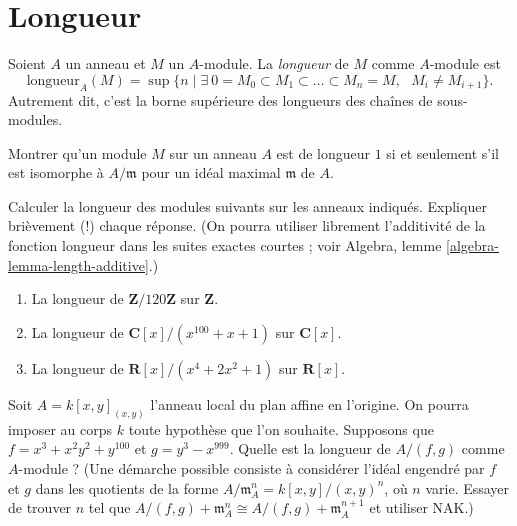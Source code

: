 \section{Longueur}
\label{section-length}

\begin{definition}
\label{definition-length}
Soient $A$ un anneau et $M$ un $A$-module. La
{\it longueur} de $M$ comme $A$-module est
$$
\text{longueur}_A(M)
=
\sup
\{
n
\mid
\exists\ 0 = M_0 \subset M_1 \subset \ldots \subset M_n = M,
\text{ }M_i \not = M_{i + 1}
\}.
$$
Autrement dit, c'est la borne supérieure des longueurs des chaînes de sous-modules.
\end{definition}

\begin{exercise}
\label{exercise-length-is-one}
Montrer qu'un module $M$ sur un anneau $A$ est de longueur $1$ si et seulement s'il
est isomorphe à $A/\mathfrak m$ pour un idéal maximal $\mathfrak m$
de $A$.
\end{exercise}

\begin{exercise}
\label{exercise-length-easy}
Calculer la longueur des modules suivants sur les anneaux indiqués.
Expliquer brièvement (!) chaque réponse. (On pourra utiliser librement l'additivité de
la fonction longueur dans les suites exactes courtes ; voir
Algebra, lemme \ref{algebra-lemma-length-additive}.)
\begin{enumerate}
\item La longueur de $\mathbf{Z}/120\mathbf{Z}$ sur $\mathbf{Z}$.
\item La longueur de $\mathbf{C}[x]/(x^{100} + x + 1)$ sur $\mathbf{C}[x]$.
\item La longueur de $\mathbf{R}[x]/(x^4 + 2x^2 + 1)$ sur $\mathbf{R}[x]$.
\end{enumerate}
\end{exercise}

\begin{exercise}
\label{exercise-compute-length}
Soit $A = k[x, y]_{(x, y)}$ l'anneau local du plan affine en
l'origine. On pourra imposer au corps $k$ toute hypothèse que l'on souhaite. Supposons
que $f = x^3 + x^2y^2 + y^{100}$ et $g = y^3 - x^{999}$. Quelle est la longueur
de $A/(f, g)$ comme $A$-module ? (Une démarche possible consiste à considérer
l'idéal engendré par $f$ et $g$ dans les quotients de la forme $A/{\mathfrak m}_A^n=
k[x, y]/(x, y)^n$, où $n$ varie. Essayer de trouver $n$ tel que
$A/(f, g)+{\mathfrak m}_A^n \cong A/(f, g)+{\mathfrak m}_A^{n + 1}$
et utiliser NAK.)
\end{exercise}






